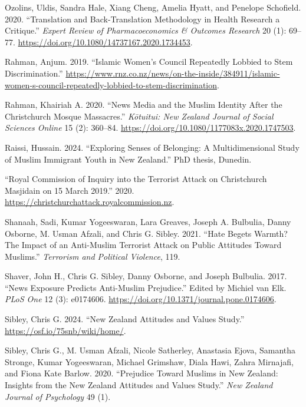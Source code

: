\documentclass[
]{interact}
\newlength{\cslhangindent}
\newenvironment{CSLReferences}[2] %
 {\begin{list}{}{%
  \setlength{\itemindent}{0pt}
  \setlength{\leftmargin}{0pt}
  \setlength{\parsep}{0pt}
  \ifodd #1
   \setlength{\leftmargin}{\cslhangindent}
   \setlength{\itemindent}{-1\cslhangindent}
  \fi
  \setlength{\itemsep}{#2\baselineskip}}}
 {\end{list}}
\begin{document}
\begin{CSLReferences}{1}{0}
Ozolins, Uldis, Sandra Hale, Xiang Cheng, Amelia Hyatt, and Penelope
Schofield. 2020. {``Translation and Back-Translation Methodology in
Health Research {\textendash} a Critique.''} \emph{Expert Review of
Pharmacoeconomics \& Outcomes Research} 20 (1): 69--77.
\url{https://doi.org/10.1080/14737167.2020.1734453}.

Rahman, Anjum. 2019. {``Islamic {W}omen's {C}ouncil Repeatedly Lobbied
to Stem Discrimination.''}
\url{https://www.rnz.co.nz/news/on-the-inside/384911/islamic-women-s-council-repeatedly-lobbied-to-stem-discrimination}.

Rahman, Khairiah A. 2020. {``News Media and the Muslim Identity After
the Christchurch Mosque Massacres.''} \emph{K{ō}tuitui: New Zealand
Journal of Social Sciences Online} 15 (2): 360--84.
\url{https://doi.org/10.1080/1177083x.2020.1747503}.

Raissi, Hussain. 2024. {``Exploring Senses of Belonging: {A}
Multidimensional Study of {M}uslim Immigrant Youth in {N}ew
{Z}ealand.''} PhD thesis, Dunedin.

{``Royal {C}ommission of {I}nquiry into the Terrorist Attack on
{C}hristchurch {M}asjidain on 15 {M}arch 2019.''} 2020.
\url{https://christchurchattack.royalcommission.nz}.

Shanaah, Sadi, Kumar Yogeeswaran, Lara Greaves, Joseph A. Bulbulia,
Danny Osborne, M. Usman Afzali, and Chris G. Sibley. 2021. {``Hate
Begets Warmth? The Impact of an Anti-{M}uslim Terrorist Attack on Public
Attitudes Toward {M}uslims.''} \emph{Terrorism and Political Violence},
119.

Shaver, John H., Chris G. Sibley, Danny Osborne, and Joseph Bulbulia.
2017. {``News Exposure Predicts Anti-Muslim Prejudice.''} Edited by
Michiel van Elk. \emph{PLoS One} 12 (3): e0174606.
\url{https://doi.org/10.1371/journal.pone.0174606}.

Sibley, Chris G. 2024. {``New Zealand Attitudes and Values Study.''}
\url{https://osf.io/75snb/wiki/home/}.

Sibley, Chris G., M. Usman Afzali, Nicole Satherley, Anastasia Ejova,
Samantha Stronge, Kumar Yogeeswaran, Michael Grimshaw, Diala Hawi, Zahra
Mirnajafi, and Fiona Kate Barlow. 2020. {``Prejudice Toward {M}uslims in
{N}ew {Z}ealand: Insights from the {N}ew {Z}ealand {A}ttitudes and
{V}alues {S}tudy.''} \emph{New Zealand Journal of Psychology} 49 (1).


\end{CSLReferences}
\end{document}
